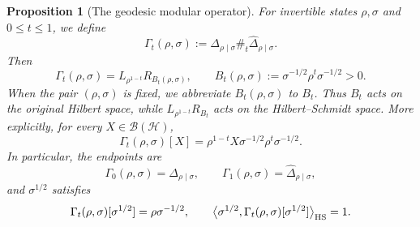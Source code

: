 \documentclass[11pt]{article}
\newtheorem{proposition}[proposition]{Proposition}
\theoremstyle{remark}
\newcommand{\1}{\mathbbm{1}}
\begin{document}
\begin{proposition}[The geodesic modular operator]
\label{rw:prop:gamma-formula}
For invertible states $\rho,\sigma$ and $0\leq t\leq1$, we define
\begin{equation}
 \Gamma_t(\rho,\sigma)
 :=\Delta_{\rho\mid\sigma}\#_t
   \widehat\Delta_{\rho\mid\sigma}.
 \label{rw:eq:gamma-geodesic-definition}
\end{equation}
Then
\begin{equation}
 \Gamma_t(\rho,\sigma)
 =L_{\rho^{1-t}}R_{B_t(\rho,\sigma)},
 \qquad
 B_t(\rho,\sigma):=\sigma^{-1/2}\rho^t\sigma^{-1/2}>0.
 \label{rw:eq:gamma-explicit}
\end{equation}
When the pair $(\rho,\sigma)$ is fixed, we abbreviate
$B_t(\rho,\sigma)$ to $B_t$.  Thus $B_t$ acts on the original Hilbert
space, while
$L_{\rho^{1-t}}R_{B_t}$ acts on the Hilbert--Schmidt space.  More
explicitly, for every $X\in\mathcal B(\mathcal H)$,
\begin{equation}
 \Gamma_t(\rho,\sigma)[X]
 =\rho^{1-t}X\sigma^{-1/2}\rho^t\sigma^{-1/2}.
 \label{rw:eq:gamma-action}
\end{equation}
In particular, the endpoints are
\begin{equation}
 \Gamma_0(\rho,\sigma)=\Delta_{\rho\mid\sigma},
 \qquad
 \Gamma_1(\rho,\sigma)=\widehat\Delta_{\rho\mid\sigma},
 \label{rw:eq:gamma-endpoints}
\end{equation}
and $\sigma^{1/2}$ satisfies
\begin{equation}
 \Gamma_t(\rho,\sigma)[\sigma^{1/2}]=\rho\sigma^{-1/2},
 \qquad
 \big\langle\sigma^{1/2},
 \Gamma_t(\rho,\sigma)[\sigma^{1/2}]\big\rangle_{\rm HS}=1.
 \label{rw:eq:gamma-normalization}
\end{equation}
\end{proposition}
\end{document}
